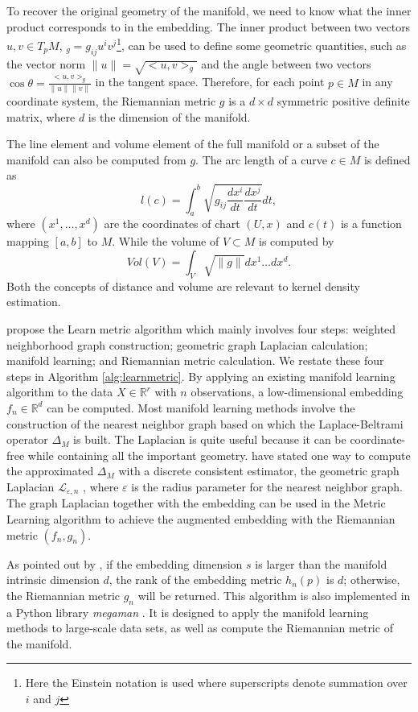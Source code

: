 \documentclass[11pt,a4paper,]{article}
\begin{document}
To recover the original geometry of the manifold, we need to know what the inner product corresponds to in the embedding.
The inner product between two vectors \(u,v \in T_pM\), \(<u,v>_g=g_{ij}u^iv^j\)\footnote{Here the Einstein notation is used where superscripts denote summation over \(i\) and \(j\)}, can be used to define some geometric quantities, such as the vector norm \(\|u\|=\sqrt{<u,v>_g}\) and the angle between two vectors \(\cos{\theta}=\frac{<u,v>_g}{\|u\|\|v\|}\) in the tangent space. Therefore, for each point \(p\in M\) in any coordinate system, the Riemannian metric \(g\) is a \(d\times d\) symmetric positive definite matrix, where \(d\) is the dimension of the manifold.

The line element and volume element of the full manifold or a subset of the manifold can also be computed from \(g\). The arc length of a curve \(c\in M\) is defined as
\[
l(c)=\int_a^b \sqrt{g_{ij} \frac{dx^i}{dt} \frac{dx^j}{dt}} dt,
\]
where \((x^1,\dots,x^d)\) are the coordinates of chart \((U,x)\) and \(c(t)\) is a function mapping \([a,b]\) to \(M\). While the volume of \(V\subset M\) is computed by
\[
Vol(V)=\int_V \sqrt{\|g\|} dx^1\dots dx^d.
\]
Both the concepts of distance and volume are relevant to kernel density estimation.

\textcite{Perrault-Joncas2013-pq} propose the Learn metric algorithm which mainly involves four steps: weighted neighborhood graph construction; geometric graph Laplacian calculation; manifold learning; and Riemannian metric calculation. We restate these four steps in Algorithm \ref{alg:learnmetric}.
By applying an existing manifold learning algorithm to the data \(X\in \mathbb{R}^r\) with \(n\) observations, a low-dimensional embedding \(f_n \in \mathbb{R}^d\) can be computed. Most manifold learning methods involve the construction of the nearest neighbor graph based on which the Laplace-Beltrami operator \(\Delta_M\) is built. The Laplacian is quite useful because it can be coordinate-free while containing all the important geometry. \textcite{Perrault-Joncas2013-pq} have stated one way to compute the approximated \(\Delta_M\) with a discrete consistent estimator, the geometric graph Laplacian \(\mathcal{L}_{\varepsilon,n}\) \autocite{Zhou2011-za}, where \(\varepsilon\) is the radius parameter for the nearest neighbor graph. The graph Laplacian together with the embedding can be used in the Metric Learning algorithm to achieve the augmented embedding with the Riemannian metric \((f_n, g_n)\).

As pointed out by \textcite{Perrault-Joncas2013-pq}, if the embedding dimension \(s\) is larger than the manifold intrinsic dimension \(d\), the rank of the embedding metric \(h_n(p)\) is \(d\); otherwise, the Riemannian metric \(g_n\) will be returned.
This algorithm is also implemented in a Python library \emph{megaman} \autocite{McQueen2016-xz}. It is designed to apply the manifold learning methods to large-scale data sets, as well as compute the Riemannian metric of the manifold.
\end{document}
